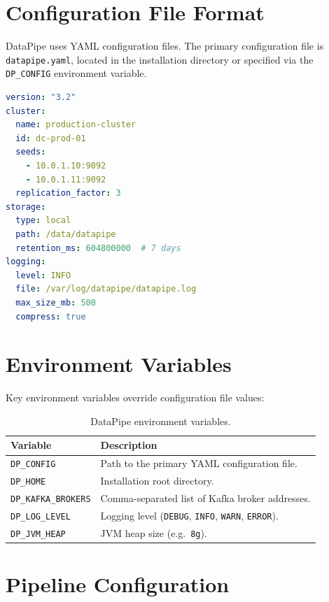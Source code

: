 \documentclass[
    language=english,
    doctype=manual,
    institution=none,
    titlestyle=book,
    oneside,
]{../../omnilatex}
\begin{document}
\section{Configuration File Format}

DataPipe uses YAML configuration files. The primary configuration file is
\texttt{datapipe.yaml}, located in the installation directory or specified
via the \texttt{DP\_CONFIG} environment variable.

\begin{lstlisting}[language=yaml, caption={Example datapipe.yaml configuration.}]
version: "3.2"
cluster:
  name: production-cluster
  id: dc-prod-01
  seeds:
    - 10.0.1.10:9092
    - 10.0.1.11:9092
  replication_factor: 3
storage:
  type: local
  path: /data/datapipe
  retention_ms: 604800000  # 7 days
logging:
  level: INFO
  file: /var/log/datapipe/datapipe.log
  max_size_mb: 500
  compress: true
\end{lstlisting}

\section{Environment Variables}

Key environment variables override configuration file values:

\begin{table}[htbp]
    \centering
    \caption{DataPipe environment variables.}
    \label{tab:env-vars}
    \begin{tabular}{@{}lp{9cm}@{}}
        \toprule
        Variable & Description \\
        \midrule
        \texttt{DP\_CONFIG} & Path to the primary YAML configuration file. \\
        \texttt{DP\_HOME} & Installation root directory. \\
        \texttt{DP\_KAFKA\_BROKERS} & Comma-separated list of Kafka broker addresses. \\
        \texttt{DP\_LOG\_LEVEL} & Logging level (\texttt{DEBUG}, \texttt{INFO}, \texttt{WARN}, \texttt{ERROR}). \\
        \texttt{DP\_JVM\_HEAP} & JVM heap size (e.g.\ \texttt{8g}). \\
        \bottomrule
    \end{tabular}
\end{table}

\section{Pipeline Configuration}
\end{document}
